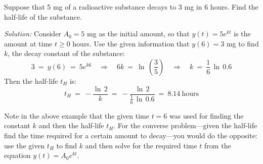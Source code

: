 \begin{exmp}
 Suppose that 5 mg of a radioactive substance decays to 3 mg in 6 hours. Find the
 half-life of the substance.\vspace{1mm}
 \par\noindent\emph{Solution:} Consider $A_0 = 5$ mg as the initial amount, so
 that $y(t) = 5 e^{kt}$ is the amount at time $t \ge 0$ hours. Use the
 given information that $y(6) = 3$ mg to find  $k$, the decay constant of the
 substance:
 \begin{displaymath}
  3 ~=~ y(6) ~=~ 5 e^{k6} \quad\Rightarrow\quad 6k ~=~ \ln\,\left(\frac{3}{5}\right)
  \quad\Rightarrow\quad k ~=~ \frac{1}{6}\,\ln\,0.6
 \end{displaymath}
 Then the half-life $t_H$ is:
 \begin{displaymath}
 t_H ~=~ -\frac{\ln\,2}{k} ~=~ -\frac{\ln\,2}{\frac{1}{6}\,\ln\,0.6} ~=~ 8.14 ~\text{hours}
 \end{displaymath}
\end{exmp}
\divider
\vspace{3mm}

\par\noindent Note in the above example that the given time $t = 6$ was used for
finding the constant $k$ and then the half-life $t_H$. For the converse
problem---given the half-life find the time required for a certain amount to
decay---you would do the opposite: use the given $t_H$ to find $k$ and then
solve for the required time $t$ from the equation $y(t) = A_0 e^{kt}$.

